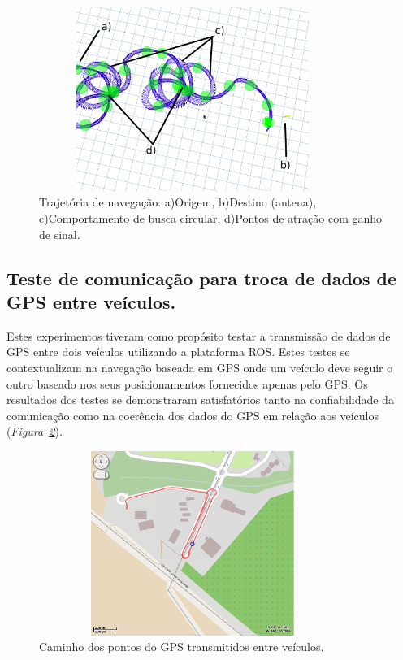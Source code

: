 \documentclass{article}
\newcommand{\fig}[1]{\textit{Figura~\ref{#1}}}
\begin{document}
\begin{figure}[ht]
	\begin{minipage}[b]{1\linewidth}
	    \centering
	    \includegraphics[width=10cm,height=6cm]{../images/beacon.png}
	 	\caption{Trajetória de navegação:
	 	a)Origem, b)Destino (antena), c)Comportamento de busca circular, d)Pontos
	 	de atração com ganho de sinal.}
	 	\label{fig:path}
	\end{minipage}
\end{figure}


\subsection{Teste de comunicação para troca de dados de GPS entre veículos.}

Estes experimentos tiveram como propósito testar a transmissão de dados de GPS
entre dois veículos utilizando a plataforma ROS. Estes testes se contextualizam
na navegação baseada em GPS onde um veículo deve seguir o outro baseado nos seus
posicionamentos fornecidos apenas pelo GPS. Os resultados dos testes se
demonstraram satisfatórios tanto na confiabilidade da comunicação como na
coerência dos dados do GPS em relação aos veículos (\fig{fig:gps_followme}).


\begin{figure}[ht]
	\begin{minipage}[b]{1\linewidth}
	    \centering
	    \includegraphics[width=10cm,height=6cm]{../images/gps_followme.png}
	 	\caption{Caminho dos pontos do GPS transmitidos entre veículos.}
	 	\label{fig:gps_followme}
	\end{minipage}
\end{figure}
\end{document}
